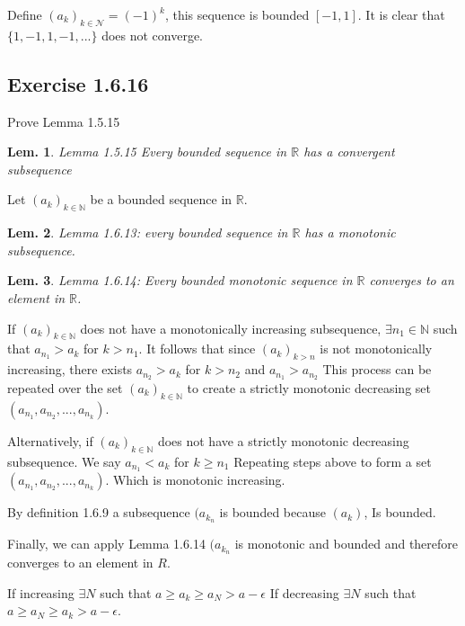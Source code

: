 \documentclass{tufte-book}
\theoremstyle{mytheoremstyle}
\theoremstyle{mylemstyle}
\newtheorem*{lem}{Lem.}
\theoremstyle{mydefstyle}
\begin{document}
Define $(a_k)_{k \in \mathcal{N}} = (-1)^k$, this sequence is bounded $[-1,1]$.  It is clear that $\{1,-1,1,-1,...\}$ does not converge.

\subsection{Exercise 1.6.16}
Prove Lemma 1.5.15
\begin{lem}Lemma 1.5.15 Every bounded sequence in $\mathbb{R}$ has a convergent subsequence\end{lem} 

Let $(a_k)_{k \in \mathbb{N}}$ be a bounded sequence in $\mathbb{R}$.

\begin{lem}Lemma 1.6.13: every bounded sequence in $\mathbb{R}$ has a monotonic subsequence.
\end{lem}

\begin{lem}Lemma 1.6.14: Every bounded monotonic sequence in $\mathbb{R}$ converges to an element in $\mathbb{R}$. 
\end{lem}

If $(a_k)_{k \in \mathbb{N}}$ does not have a monotonically increasing subsequence, $\exists n_1 \in \mathbb{N}$ such that $a_{n_{1}} > a_k$ for $k > n_1$. It follows that since $(a_k)_{k>n}$ is not monotonically increasing, there exists $a_{n_{2}} > a_k$ for $k > n_2$ and $a_{n_{1}} > a_{n_{2}}$ 
This process can be repeated over the set $(a_k)_{k \in \mathbb{N}}$ to create a strictly monotonic decreasing set $(a_{n_{1}}, a_{n_{2}}, ..., a_{n_{k}})$.

Alternatively, if $(a_k)_{k \in \mathbb{N}}$ does not have a strictly monotonic decreasing subsequence.  We say $a_{n_{1}} < a_k$  for $k \geq n_1$ Repeating steps above to form a set $(a_{n_{1}}, a_{n_{2}}, ..., a_{n_{k}})$. Which is monotonic increasing.

By definition 1.6.9 a subsequence $(a_{k_{n}}$ is bounded because $(a_{k})$, Is bounded.

Finally, we can apply Lemma 1.6.14  $(a_{k_{n}}$ is monotonic and bounded and therefore converges to an element in ${R}$.

If increasing $\exists N$ such that $a \geq a_k \geq a_N > a - \epsilon$  If decreasing $\exists N$ such that $a \geq a_N \geq a_k > a - \epsilon$.
\end{document}
